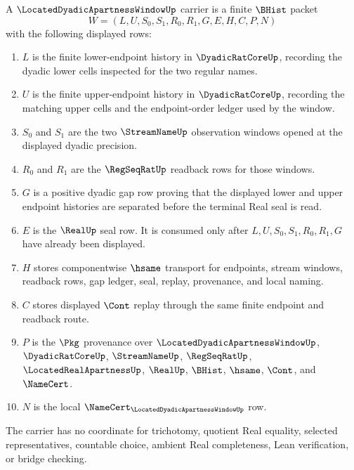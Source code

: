 \begin{definition}
\label{def:located-dyadic-apartness-window-carrier}
A $\LocatedDyadicApartnessWindowUp$ carrier is a finite $\BHist$ packet
$$
W=(L,U,S_0,S_1,R_0,R_1,G,E,H,C,P,N)
$$
with the following displayed rows:
\begin{enumerate}
\item $L$ is the finite lower-endpoint history in $\DyadicRatCoreUp$, recording the dyadic lower cells inspected for the two regular names.
\item $U$ is the finite upper-endpoint history in $\DyadicRatCoreUp$, recording the matching upper cells and the endpoint-order ledger used by the window.
\item $S_0$ and $S_1$ are the two $\StreamNameUp$ observation windows opened at the displayed dyadic precision.
\item $R_0$ and $R_1$ are the $\RegSeqRatUp$ readback rows for those windows.
\item $G$ is a positive dyadic gap row proving that the displayed lower and upper endpoint histories are separated before the terminal Real seal is read.
\item $E$ is the $\RealUp$ seal row. It is consumed only after $L,U,S_0,S_1,R_0,R_1,G$ have already been displayed.
\item $H$ stores componentwise $\hsame$ transport for endpoints, stream windows, readback rows, gap ledger, seal, replay, provenance, and local naming.
\item $C$ stores displayed $\Cont$ replay through the same finite endpoint and readback route.
\item $P$ is the $\Pkg$ provenance over $\LocatedDyadicApartnessWindowUp$, $\DyadicRatCoreUp$, $\StreamNameUp$, $\RegSeqRatUp$, $\LocatedRealApartnessUp$, $\RealUp$, $\BHist$, $\hsame$, $\Cont$, and $\NameCert$.
\item $N$ is the local $\NameCert_{\LocatedDyadicApartnessWindowUp}$ row.
\end{enumerate}
The carrier has no coordinate for trichotomy, quotient Real equality, selected representatives, countable choice, ambient Real completeness, Lean verification, or bridge checking.
\end{definition}

